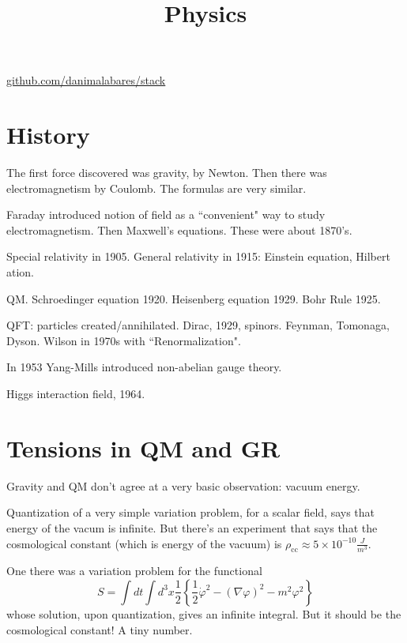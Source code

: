 



\title{Physics}
\maketitle

\label{section-phantom}
\hfill
\href{http://github.com/danimalabares/stack}{github.com/danimalabares/stack}

\tableofcontents

\section{History}
\label{section-history}

The first force discovered was gravity, by Newton. Then there was
electromagnetism by Coulomb. The formulas are very similar.

Faraday introduced notion of field as a ``convenient" way to study
electromagnetism. Then Maxwell's equations. These were about 1870's.

Special relativity in 1905. General relativity in 1915: Einstein equation, Hilbert
ation.

QM. Schroedinger equation 1920. Heisenberg equation 1929. Bohr Rule 1925.

QFT: particles created/annihilated. Dirac, 1929, spinors. Feynman, Tomonaga,
Dyson. Wilson in 1970s with ``Renormalization".

In 1953 Yang-Mills introduced non-abelian gauge theory.

Higgs interaction field, 1964.

\section{Tensions in QM and GR}
\label{section-tensions}

Gravity and QM don't agree at a very basic observation: vacuum energy.

Quantization of a very simple variation problem, for a scalar field, says that
energy of the vacum is infinite. But there's an experiment that says that the
cosmological constant (which is energy of the vacuum) is
 $\rho_{\operatorname{cc}}\approx 5 \times 10^{-10}\frac{J}{m^3}$.

One there was a variation problem for the functional
$$
S=\int dt \int d^3x \frac{1}{2}\left\{ \frac{1}{2}\dot\varphi^2-(\nabla \varphi)^2-m^2\varphi^2\right\} 
$$
whose solution, upon quantization, gives an infinite integral. But it should be
the cosmological constant! A tiny number.

